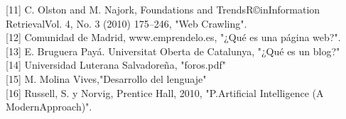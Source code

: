 [11] C. Olston and M. Najork, Foundations and TrendsR©inInformation RetrievalVol. 4, No. 3 (2010) 175–246, "Web Crawling".\\

[12] Comunidad de Madrid, www.emprendelo.es, "¿Qué es una página web?".\\

[13] E. Bruguera Payá. Universitat Oberta de Catalunya, "¿Qué es un blog?"\\

[14] Universidad Luterana Salvadoreña, "foros.pdf"\\

[15] M. Molina Vives,"Desarrollo del lenguaje"\\

[16] Russell, S. y Norvig, Prentice Hall, 2010, "P.Artificial Intelligence (A ModernApproach)".